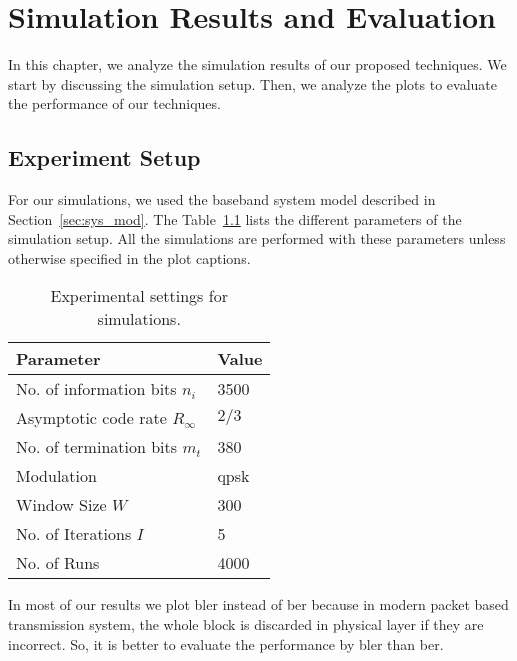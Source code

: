 \chapter{Simulation Results and Evaluation}\label{ch:simulation}
In this chapter, we analyze the simulation results of our proposed techniques. We start by discussing the simulation setup. Then, we analyze the plots to evaluate the performance of our techniques.

\section{Experiment Setup}
For our simulations, we used the baseband system model described in Section~\ref{sec:sys_mod}. The Table~\ref{tab:sim_param} lists the different parameters of the simulation setup. All the simulations are performed with these parameters unless otherwise specified in the plot captions.
\begin{table}[htbp]
\centering
\begin{tabular}{|l|l|}
  \hline
  \textbf{Parameter} &\textbf{Value}\\
  \hline
  \hline
  No. of information bits $n_i$ &3500\\
  \hline
  Asymptotic code rate $R_\infty$ &$2/3$\\
  \hline
  No. of termination bits $m_t$ &380\\
  \hline
  Modulation &\gls{qpsk}\\
  \hline
  Window Size $W$ &300\\
  \hline
  No. of Iterations $I$ &5\\
  \hline
  No. of Runs &4000\\
  \hline
\end{tabular}
\caption{Experimental settings for simulations.}
\label{tab:sim_param}
\end{table}

In most of our results we plot \gls{bler} instead of \gls{ber} because in modern packet based transmission system, the whole block is discarded in physical layer if they are incorrect. So, it is better to evaluate the performance by \gls{bler} than \gls{ber}.
